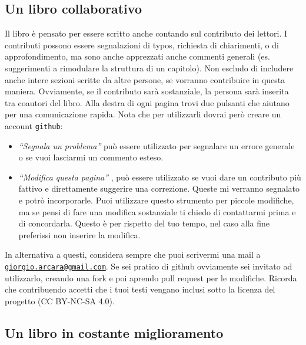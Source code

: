 \documentclass[
  italian,
  letterpaper,
  paper=A4,
  headinclude=on,
  footinclude=on,
  12pt]{scrbook}
\providecommand{\tightlist}{%
  \setlength{\itemsep}{0pt}\setlength{\parskip}{0pt}}
\begin{document}
\subsection*{Un libro collaborativo}\label{un-libro-collaborativo}

Il libro è pensato per essere scritto anche contando sul contributo dei
lettori. I contributi possono essere segnalazioni di typos, richiesta di
chiarimenti, o di approfondimento, ma sono anche apprezzati anche
commenti generali (es. suggerimenti a rimodulare la struttura di un
capitolo). Non escludo di includere anche intere sezioni scritte da
altre persone, se vorranno contribuire in questa maniera. Ovviamente, se
il contributo sarà sostanziale, la persona sarà inserita tra coautori
del libro. Alla destra di ogni pagina trovi due pulsanti che aiutano per
una comunicazione rapida. Nota che per utilizzarli dovrai però creare un
account \texttt{github}:

\begin{itemize}
\tightlist
\item
  \emph{``Segnala un problema''} può essere utilizzato per segnalare un
  errore generale o se vuoi lasciarmi un commento esteso.
\item
  \emph{``Modifica questa pagina''} , può essere utilizzato se vuoi dare
  un contributo più fattivo e direttamente suggerire una correzione.
  Queste mi verranno segnalato e potrò incorporarle. Puoi utilizzare
  questo strumento per piccole modifiche, ma se pensi di fare una
  modifica sostanziale ti chiedo di contattarmi prima e di concordarla.
  Questo è per rispetto del tuo tempo, nel caso alla fine preferissi non
  inserire la modifica.
\end{itemize}

In alternativa a questi, considera sempre che puoi scrivermi una mail a
\href{mailto:giorgio.arcara@gmail.com}{\nolinkurl{giorgio.arcara@gmail.com}}.
Se sei pratico di github ovviamente sei invitato ad utilizzarlo, creando
una fork e poi aprendo pull request per le modifiche. Ricorda che
contribuendo accetti che i tuoi testi vengano inclusi sotto la licenza
del progetto (CC BY-NC-SA 4.0).

\subsection*{Un libro in costante
miglioramento}\label{un-libro-in-costante-miglioramento}
\end{document}
